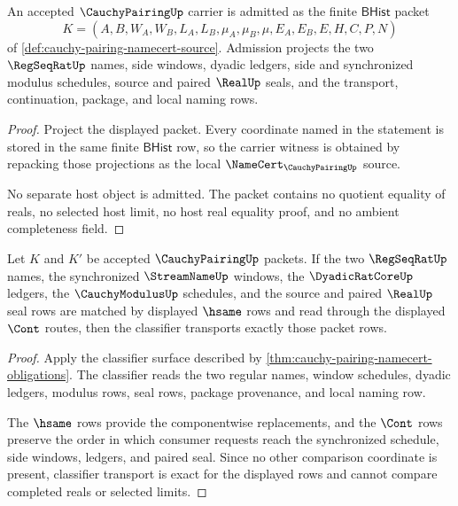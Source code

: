 \begin{theorem}
\label{thm:cauchy-pairing-carrier-admission}
An accepted $\CauchyPairingUp$ carrier is admitted as the finite $\mathsf{BHist}$ packet
$$
K=(A,B,W_A,W_B,L_A,L_B,\mu_A,\mu_B,\mu,E_A,E_B,E,H,C,P,N)
$$
of \autoref{def:cauchy-pairing-namecert-source}. Admission projects the two $\RegSeqRatUp$ names, side windows, dyadic ledgers, side and synchronized modulus schedules, source and paired $\RealUp$ seals, and the transport, continuation, package, and local naming rows.
\end{theorem}
\begin{proof}
Project the displayed packet. Every coordinate named in the statement is stored in the same finite $\mathsf{BHist}$ row, so the carrier witness is obtained by repacking those projections as the local $\NameCert_{\CauchyPairingUp}$ source.

No separate host object is admitted. The packet contains no quotient equality of reals, no selected host limit, no host real equality proof, and no ambient completeness field.
\end{proof}

\begin{theorem}
\label{thm:cauchy-pairing-classifier-transport-exactness}
Let $K$ and $K'$ be accepted $\CauchyPairingUp$ packets. If the two $\RegSeqRatUp$ names, the synchronized $\StreamNameUp$ windows, the $\DyadicRatCoreUp$ ledgers, the $\CauchyModulusUp$ schedules, and the source and paired $\RealUp$ seal rows are matched by displayed $\hsame$ rows and read through the displayed $\Cont$ routes, then the classifier transports exactly those packet rows.
\end{theorem}
\begin{proof}
Apply the classifier surface described by \autoref{thm:cauchy-pairing-namecert-obligations}. The classifier reads the two regular names, window schedules, dyadic ledgers, modulus rows, seal rows, package provenance, and local naming row.

The $\hsame$ rows provide the componentwise replacements, and the $\Cont$ rows preserve the order in which consumer requests reach the synchronized schedule, side windows, ledgers, and paired seal. Since no other comparison coordinate is present, classifier transport is exact for the displayed rows and cannot compare completed reals or selected limits.
\end{proof}

